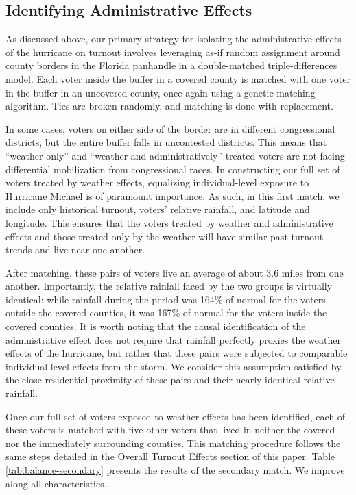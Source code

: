 \documentclass[
  12pt,
]{article}
\begin{document}
\hypertarget{identifying-administrative-effects}{%
\subsection*{Identifying Administrative Effects}\label{identifying-administrative-effects}}

As discussed above, our primary strategy for isolating the administrative effects of the hurricane on turnout involves leveraging as-if random assignment around county borders in the Florida panhandle in a double-matched triple-differences model. Each voter inside the buffer in a covered county is matched with one voter in the buffer in an uncovered county, once again using a genetic matching algorithm. Ties are broken randomly, and matching is done with replacement.

In some cases, voters on either side of the border are in different congressional districts, but the entire buffer falls in uncontested districts. This means that ``weather-only'' and ``weather and administratively'' treated voters are not facing differential mobilization from congressional races. In constructing our full set of voters treated by weather effects, equalizing individual-level exposure to Hurricane Michael is of paramount importance. As such, in this first match, we include only historical turnout, voters' relative rainfall, and latitude and longitude. This ensures that the voters treated by weather and administrative effects and those treated only by the weather will have similar past turnout trends and live near one another.

After matching, these pairs of voters live an average of about 3.6 miles from one another. Importantly, the relative rainfall faced by the two groups is virtually identical: while rainfall during the period was 164\% of normal for the voters outside the covered counties, it was 167\% of normal for the voters inside the covered counties. It is worth noting that the causal identification of the administrative effect does not require that rainfall perfectly proxies the weather effects of the hurricane, but rather that these pairs were subjected to comparable individual-level effects from the storm. We consider this assumption satisfied by the close residential proximity of these pairs and their nearly identical relative rainfall.

Once our full set of voters exposed to weather effects has been identified, each of these voters is matched with five other voters that lived in neither the covered nor the immediately surrounding counties. This matching procedure follows the same steps detailed in the Overall Turnout Effects section of this paper. Table \ref{tab:balance-secondary} presents the results of the secondary match. We improve along all characteristics.
\end{document}
